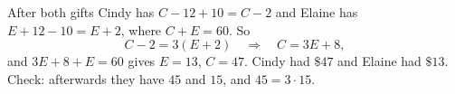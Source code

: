 After both gifts Cindy has $C-12+10=C-2$ and Elaine has $E+12-10=E+2$, where $C+E=60$. So
\[
C-2=3(E+2)\quad\Longrightarrow\quad C=3E+8,
\]
and $3E+8+E=60$ gives $E=13$, $C=47$. Cindy had $\boxed{\$47}$ and Elaine had $\boxed{\$13}$. Check: afterwards they have $45$ and $15$, and $45=3\cdot15$.
